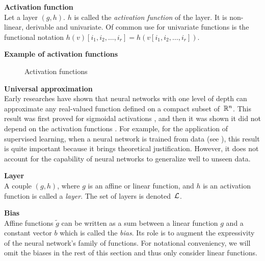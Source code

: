\begin{definition}\textbf{Activation function}\\
Let a layer $(g,h)$. $h$ is called the \emph{activation function} of the layer. It is non-linear, derivable and univariate. Of common use for univariate functions is the functional notation $h(v)[i_1, i_2, \ldots, i_r] = h(v[i_1, i_2, \ldots, i_r])$.
\end{definition}

\begin{remark}\textbf{Example of activation functions}\\
\end{remark}

\begin{figure}[H]
\centering
{}
\caption{Activation functions}
\label{fig:neuron}
\end{figure}

\begin{remark}\textbf{Universal approximation}\\
Early researches have shown that neural networks with one level of depth can approximate any real-valued function defined on a compact subset of~$\mathbb{R}^n$. This result was first proved for sigmoidal activations \citep{cybenko1989approximation}, and then it was shown it did not depend on the activation functions \citep{hornik1989multilayer,hornik1991approximation}. For example, for the application of supervised learning, when a neural network is trained from data (see ), this result is quite important because it brings theoretical justification. However, it does not account for the capability of neural networks to generalize well to unseen data.
\end{remark}

\begin{definition}\textbf{Layer}\\
A couple $(g,h)$, where $g$ is an affine or linear function, and $h$ is an activation function is called a \emph{layer}. The set of layers is denoted~$\mathcal{L}$.
\end{definition}

\begin{remark}\textbf{Bias}\\
Affine functions $\widetilde{g}$ can be written as a sum between a linear function $g$ and a constant vector $b$ which is called the \emph{bias}. Its role is to augment the expressivity of the neural network's family of functions. For notational conveniency, we will omit the biases in the rest of this section and thus only consider linear functions.
\end{remark}


